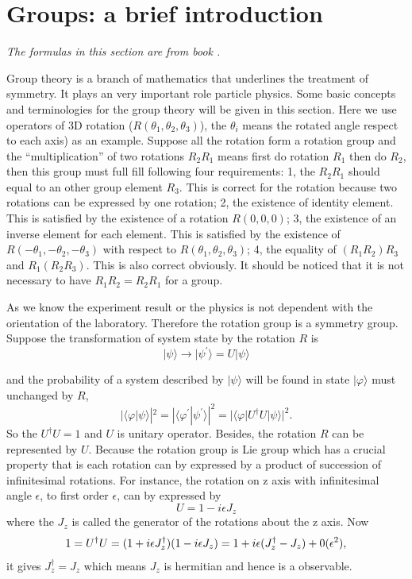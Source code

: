 \section{Groups: a brief introduction}\label{sec:Groups}
\textit{The formulas in this section are from book \cite{Quark_Lepton}.}

Group theory is a branch of mathematics that underlines the treatment of symmetry. It plays an very important role particle physics. Some basic concepts and terminologies for the group theory will be given in this section. Here we use operators of 3D rotation ($R(\theta_1,\theta_2,\theta_3)$), the $\theta_i$ means the rotated angle respect to each axis) as an example. Suppose all the rotation form a rotation group and the ``multiplication'' of two rotations $R_2 R_1$ means first do rotation $R_1$ then do $R_2$, then this group must full fill following four requirements: 1, the $R_2 R_1$ should equal to an other group element $R_3$. This is correct for the rotation because two rotations can be expressed by one rotation; 2, the existence of identity element. This is satisfied by the existence of a rotation $R(0,0,0)$; 3, the existence of an inverse element for each element. This is satisfied by the existence of $R(-\theta_1,-\theta_2,-\theta_3)$ with respect to $R(\theta_1,\theta_2,\theta_3)$; 4, the equality of $(R_1 R_2) R_3$ and $R_1 (R_2 R_3)$. This is also correct obviously. It should be noticed that it is not necessary to have $R_1 R_2=R_2 R_1$ for a group.

As we know the experiment result or the physics is not dependent with the orientation of the laboratory. Therefore the rotation group is a symmetry group. Suppose the transformation of system state by the rotation $R$ is
$$|\psi\rangle\rightarrow|\psi^{'}\rangle=U|\psi\rangle$$

and the probability of a system described by $|\psi\rangle$ will be found in state $|\varphi\rangle$ must unchanged by $R$,
$$|\langle\varphi|\psi\rangle|^{2}=|\langle\varphi^{'}|\psi^{'}\rangle|^{2}=|\langle\varphi| U^{\dag}U|\psi\rangle|^{2}.$$
So the $U^{\dag}U=1$ and $U$ is unitary operator. Besides, the rotation $R$ can be represented by $U$. Because the rotation group is Lie group which has a crucial property that is each rotation can by expressed by a product of succession of infinitesimal rotations. For instance, the rotation on z axis with infinitesimal angle $\epsilon$, to first order $\epsilon$, can by expressed by 
$$U=1-i\epsilon J_z$$
where the $J_z$ is called the generator of the rotations about the z axis. Now 
$$1=U^{\dag}U=(1+i\epsilon J_z^{\dag})(1-i\epsilon J_z)\\=1+ i\epsilon(J_z^{\dag}-J_z)+0(\epsilon^{2}),$$
it gives $J_z^{\dag}=J_z$ which means $J_z$ is hermitian and hence is a observable.

